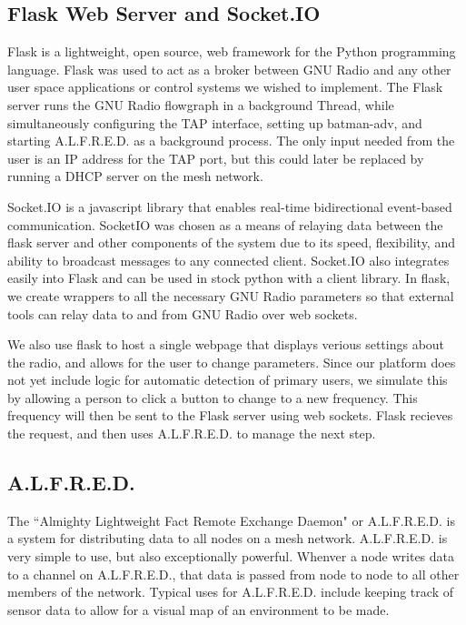 \subsection{Flask Web Server and Socket.IO}

Flask is a lightweight, open source, web framework for the Python programming language. Flask was used to act as a broker between GNU Radio and any other user space applications or control systems we wished to implement. The Flask server runs the GNU Radio flowgraph in a background Thread, while simultaneously configuring the TAP interface, setting up batman-adv, and starting A.L.F.R.E.D. as a background process. The only input needed from the user is an IP address for the TAP port, but this could later be replaced by running a DHCP server on the mesh network. 

Socket.IO is a javascript library that enables real-time bidirectional event-based communication.  SocketIO was chosen as a means of relaying data between the flask server and other components of the system due to its speed, flexibility, and ability to broadcast messages to any connected client. Socket.IO also integrates easily into Flask and can be used in stock python with a client library. In flask, we create wrappers to all the necessary GNU Radio parameters so that external tools can relay data to and from GNU Radio over web sockets.  

We also use flask to host a single webpage that displays verious settings about the radio, and allows for the user to change parameters. Since our platform does not yet include logic for automatic detection of primary users, we simulate this by allowing a person to click a button to change to a new frequency. This frequency will then be sent to the Flask server using web sockets. Flask recieves the request, and then uses A.L.F.R.E.D. to manage the next step. 

\subsection{A.L.F.R.E.D.}

 The ``Almighty Lightweight Fact Remote Exchange Daemon" or A.L.F.R.E.D. is a system for distributing data to all nodes on a mesh network. A.L.F.R.E.D. is very simple to use, but also exceptionally powerful. Whenver a node writes data to a channel on A.L.F.R.E.D., that data is passed from node to node to all other members of the network. Typical uses for A.L.F.R.E.D. include keeping track of sensor data to allow for a visual map of an environment to be made. 


